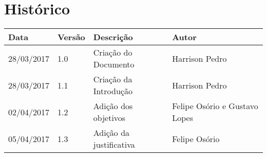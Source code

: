 \chapter{Histórico}

\begin{tabular}{ |p{3cm}|p{3cm}|p{3cm}|p{3cm}|  }
 \hline
 Data 		& 		Versão & 		Descrição 			& 		Autor\\
 \hline\hline
 28/03/2017 & 		1.0    &		Criação do Documento &   	Harrison Pedro	  \\
 \hline
 28/03/2017 & 		1.1    &		Criação da Introdução &   	Harrison Pedro	  \\
 \hline
 02/04/2017 & 		1.2    &		Adição dos objetivos &   	Felipe Osório e Gustavo Lopes	  \\
 \hline
 05/04/2017 & 		1.3    &		Adição da justificativa &   Felipe Osório	  \\
 \hline
\end{tabular}


